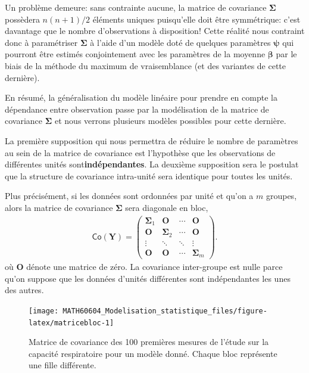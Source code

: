 \documentclass[
  11pt,
  letterpaper,
]{article}
\theoremstyle{definition}
\theoremstyle{definition}
\theoremstyle{definition}
\theoremstyle{definition}
\theoremstyle{remark}
\begin{document}
Un problème demeure: sans contrainte aucune, la matrice de covariance \(\boldsymbol{\Sigma}\) possèdera \(n(n+1)/2\) éléments uniques puisqu'elle doit être symmétrique: c'est davantage que le nombre d'observations à disposition! Cette réalité nous contraint donc à paramétriser \(\boldsymbol{\Sigma}\) à l'aide d'un modèle doté de quelques paramètres \(\boldsymbol{\psi}\) qui pourront être estimés conjointement avec les paramètres de la moyenne \(\boldsymbol{\beta}\) par le biais de la méthode du maximum de vraisemblance (et des variantes de cette dernière).

En résumé, la généralisation du modèle linéaire pour prendre en compte la dépendance entre observation passe par la modélisation de la matrice de covariance \(\boldsymbol{\Sigma}\) et nous verrons plusieurs modèles possibles pour cette dernière.

La première supposition qui nous permettra de réduire le nombre de paramètres au sein de la matrice de covariance est l'hypothèse que les observations de différentes unités sont\textbf{indépendantes}. La deuxième supposition sera le postulat que la structure de covariance intra-unité sera identique pour toutes les unités.

Plus précisément, si les données sont ordonnées par unité et qu'on a \(m\) groupes, alors la matrice de covariance \(\boldsymbol{\Sigma}\) sera diagonale en bloc,
\begin{align*}
 \mathsf{Co}(\boldsymbol{Y}) = \begin{pmatrix}
                \boldsymbol{\Sigma}_1 & \mathbf{O} & \cdots & \mathbf{O}\\
                 \mathbf{O} &\boldsymbol{\Sigma}_2 & \cdots & \mathbf{O} \\
                 \vdots & \ddots & \ddots & \vdots \\
                  \mathbf{O} & \mathbf{O} & \cdots & \boldsymbol{\Sigma}_m
               \end{pmatrix}.
\end{align*}
où \(\mathbf{O}\) dénote une matrice de zéro. La covariance inter-groupe est nulle parce qu'on suppose que les données d'unités différentes sont indépendantes les unes des autres.

\begin{figure}

{\centering \texttt{[image: MATH60604\_Modelisation\_statistique\_files/figure-latex/matricebloc-1]} 

}

\caption{Matrice de covariance des 100 premières mesures de l'étude sur la capacité respiratoire pour un modèle donné. Chaque bloc représente une fille différente.}\label{fig:matricebloc}
\end{figure}
\end{document}
